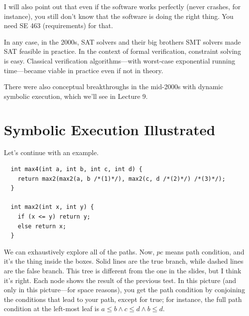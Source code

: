 \documentclass[11pt]{article}
\begin{document}
I will also point out that even if the software works perfectly (never crashes, for instance), you still don't know that the software is doing the right thing. You need SE 463 (requirements)
for that.

In any case, in the 2000s, SAT solvers and their big brothers SMT solvers made SAT feasible in practice. In the context of formal verification, constraint solving is easy. Classical verification
algorithms---with worst-case exponential running time---became viable in practice even if not in theory.

There were also conceptual breakthroughs in the mid-2000s with dynamic symbolic execution, which we'll see in Lecture 9.

\section*{Symbolic Execution Illustrated}
Let's continue with an example.
\begin{lstlisting}
  int max4(int a, int b, int c, int d) {
    return max2(max2(a, b /*(1)*/), max2(c, d /*(2)*/) /*(3)*/);
  }

  int max2(int x, int y) {
    if (x <= y) return y;
    else return x;
  }
\end{lstlisting}
We can exhaustively explore all of the paths. Now, $\mathit{pc}$ means path condition, and it's the thing inside the boxes. Solid lines are the true branch, while dashed lines are the false branch.
This tree is different from the one in the slides, but I think it's right. Each node shows the result of the previous test. In this picture (and only in this picture---for space reasons), you get
the path condition by conjoining the conditions that lead to your path, except for \textsf{true}; for instance, the full path condition at the left-most leaf is $a \le b \wedge c \le d \wedge b \le d$.
\end{document}
